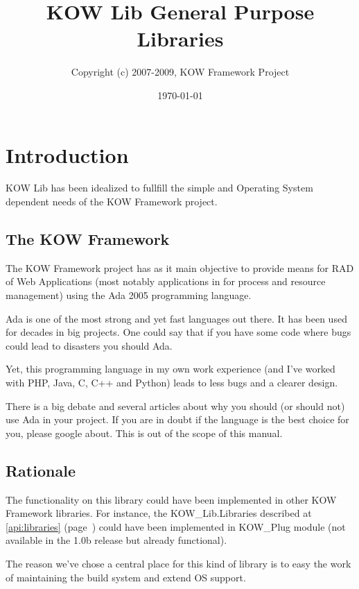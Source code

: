 \documentclass[english,letterpaper]{book}
\newcommand\Ref[1]{\textsection\ref{#1} (page~\pageref{#1})}
\begin{document}
\title{KOW Lib General Purpose Libraries}
\author{%
Copyright (c) 2007-2009, KOW Framework Project
}
\date{\today}
\maketitle

\tableofcontents{}
\listoftables

\chapter{Introduction}
KOW Lib has been idealized to fullfill the simple and Operating System dependent needs
of the KOW Framework project.



\section{The KOW Framework}
The KOW Framework project has as it main objective to provide means for RAD of Web
Applications (most notably applications in for process and resource management)
using the Ada 2005 programming language.

Ada is one of the most strong and yet fast languages out there. It has been used
for decades in big projects. One could say that if you have some code where bugs
could lead to disasters you should Ada.

Yet, this programming language in my own work experience (and I've worked with PHP,
Java, C, C++ and Python) leads to less bugs and a clearer design.

There is a big debate and several articles about why you should (or should not) use
Ada in your project. If you are in doubt if the language is the best choice for you,
please google about. This is out of the scope of this manual.


\section{Rationale}
The functionality on this library could have been implemented in other KOW Framework
libraries. For instance, the KOW\_Lib.Libraries described at \Ref{api:libraries} could have been
implemented in KOW\_Plug module (not available in the 1.0b release but already functional).

The reason we've chose a central place for this kind of library is to easy the work
of maintaining the build system and extend OS support.
\end{document}
